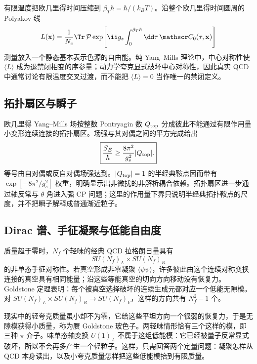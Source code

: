 有限温度把欧几里得时间压缩到 $\beta_T\hbar=\hbar/(k_BT)$。沿整个欧几里得时间圆周的 Polyakov 线
\begin{equation*}
 L(\mathbf x)
 =\frac1{N_c}\Tr\,\mathcal P
 \exp\!\left[
 \ii g_s\int_0^{\beta_T\hbar}\dd\tau\,
 \mathscr C_0(\tau,\mathbf x)
 \right]
\end{equation*}
测量放入一个静态基本表示色源的自由能。纯 Yang--Mills 理论中，中心对称性使 $\langle L\rangle$ 成为退禁闭相变的序参量；动力学夸克显式破坏中心对称性，因此真实 QCD 中通常讨论有限温度交叉过渡，而不能把 $\langle L\rangle=0$ 当作唯一的禁闭定义。

\subsection{拓扑扇区与瞬子}

欧几里得 Yang--Mills 场按整数 Pontryagin 数 $Q_{\rm top}$ 分成彼此不能通过有限作用量小变形连续连接的拓扑扇区。场强与其对偶之间的平方完成给出
\begin{equation}
 \boxed{
 \frac{S_E}{\hbar}
 \ge\frac{8\pi^2}{g_s^2}|Q_{\rm top}|.}
 \label{eq:instanton-action-bound-dp11}
\end{equation}
等号由自对偶或反自对偶场强达到。$|Q_{\rm top}|=1$ 的半经典鞍点因而带有 $\exp[-8\pi^2/g_s^2]$ 权重，明确显示出非微扰的非解析耦合依赖。拓扑扇区进一步通过轴反常与 $\theta$ 角进入强 CP 问题；这里的作用量下界只说明半经典拓扑鞍点的尺度，并不把瞬子解释成普通渐近粒子。

\subsection{Dirac 谱、手征凝聚与低能自由度}

质量趋于零时，$N_f$ 个轻味的经典 QCD 拉格朗日量具有
\begin{equation*}
 SU(N_f)_L\times SU(N_f)_R
\end{equation*}
的非单态手征对称性。若真空形成非零凝聚 $\langle\bar\psi\psi\rangle$，许多彼此由这个连续对称变换连接的真空具有相同能量；沿这些等能真空的切向方向移动没有恢复力。Goldstone 定理表明：每个被真空选择破坏的连续生成元都对应一个低能无隙模。对 $SU(N_f)_L\times SU(N_f)_R\to SU(N_f)_V$，这样的方向共有 $N_f^2-1$ 个。

现实中的轻夸克质量虽小却不为零，它给这些平坦方向一个很弱的恢复力，于是无隙模获得小质量，称为赝 Goldstone 玻色子。两轻味情形恰有三个这样的模，即三种 \(\pi\) 介子。味单态轴变换 $U(1)_A$ 不属于这组低能模：它已经被量子反常显式破坏，所以不会再多产生一个轻粒子。这样，只需回答两个定量问题：凝聚怎样从 QCD 本身读出，以及小夸克质量怎样把这些低能模抬到有限质量。

